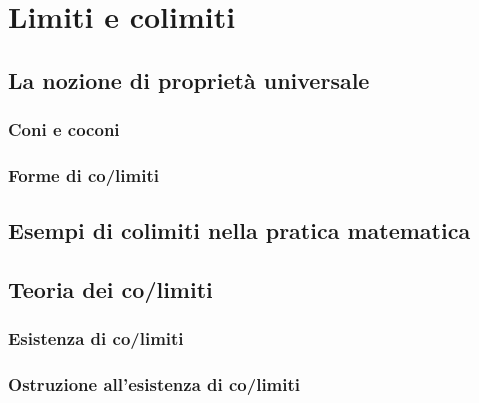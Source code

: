 \chapter{Limiti e colimiti}\label{chap_limiti_colimiti}
\section{La nozione di proprietà universale}
\begin{esercizi}
\item \item \item \item \item 
\end{esercizi}
\subsection{Coni e coconi}
\subsection{Forme di co/limiti}
\section{Esempi di colimiti nella pratica matematica}
\begin{esercizi}
\item \item \item \item \item 
\end{esercizi}
\section{Teoria dei co/limiti}
\begin{esercizi}
\item \item \item \item \item 
\end{esercizi}
\subsection{Esistenza di co/limiti}
\subsection{Ostruzione all'esistenza di co/limiti}
